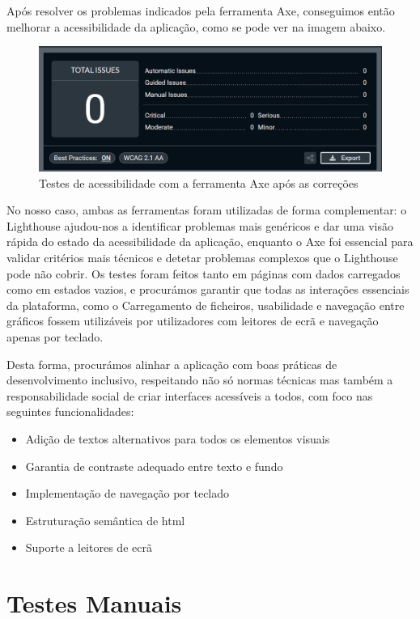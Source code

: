 Após resolver os problemas indicados pela ferramenta Axe, conseguimos então melhorar a acessibilidade da aplicação, como se pode ver na imagem abaixo.

\begin{figure}[H]
\centering
\includegraphics[width=\textwidth]{./img/axe_after}
\caption{Testes de acessibilidade com a ferramenta Axe após as correções}
\end{figure}

No nosso caso, ambas as ferramentas foram utilizadas de forma complementar: o Lighthouse ajudou-nos a identificar problemas mais genéricos e dar uma visão rápida do estado da acessibilidade da aplicação, enquanto o Axe foi essencial para validar critérios mais técnicos e detetar problemas complexos que o Lighthouse pode não cobrir. Os testes foram feitos tanto em páginas com dados carregados como em estados vazios, e procurámos garantir que todas as interações essenciais da plataforma,  como o Carregamento de ficheiros, usabilidade e navegação entre gráficos fossem utilizáveis por utilizadores com leitores de ecrã e navegação apenas por teclado.

Desta forma, procurámos alinhar a aplicação com boas práticas de desenvolvimento inclusivo, respeitando não só normas técnicas mas também a responsabilidade social de criar interfaces acessíveis a todos, com foco nas seguintes funcionalidades:
\begin{itemize}
    \item Adição de textos alternativos para todos os elementos visuais
    \item Garantia de contraste adequado entre texto e fundo
    \item Implementação de navegação por teclado
    \item Estruturação semântica de \gls{html}
    \item Suporte a leitores de ecrã
\end{itemize}

\section{Testes Manuais}

